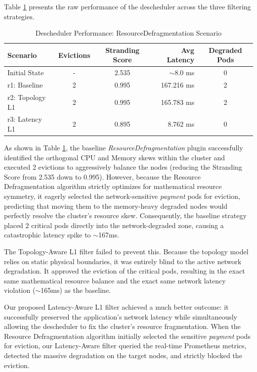 Table \ref{tab:resourcedefrag_results} presents the raw performance of the descheduler across the three filtering strategies.
\begin{table}[tbp]
    \centering
    \begin{tabular}{@{}l c c r c@{}}
        \toprule
        \textbf{Scenario} & \textbf{Evictions} & \textbf{Stranding Score} & \textbf{Avg Latency} & \textbf{Degraded Pods} \\
        \midrule
        Initial State & - & 2.535 & $\sim$8.0 ms & 0 \\
        \midrule
        r1: Baseline & 2 & 0.995 & 167.216 ms & 2 \\
        r2: Topology L1 & 2 & 0.995 & 165.783 ms & 2 \\
        r3: Latency L1 & 2 & 0.895 & 8.762 ms & 0 \\
        \bottomrule
    \end{tabular}
    \caption{Descheduler Performance: ResourceDefragmentation Scenario}
    \label{tab:resourcedefrag_results}
\end{table}

As shown in Table \ref{tab:resourcedefrag_results}, the baseline \textit{ResourceDefragmentation} plugin successfully identified the orthogonal CPU and Memory skews within the cluster and executed 2 evictions to aggressively balance the nodes (reducing the Stranding Score from 2.535 down to 0.995). However, because the Resource Defragmentation algorithm strictly optimizes for mathematical resource symmetry, it eagerly selected the network-sensitive \textit{payment} pods for eviction, predicting that moving them to the memory-heavy degraded nodes would perfectly resolve the cluster's resource skew. Consequently, the baseline strategy placed 2 critical pods directly into the network-degraded zone, causing a catastrophic latency spike to $\sim$167ms.

The Topology-Aware L1 filter failed to prevent this. Because the topology model relies on static physical boundaries, it was entirely blind to the active network degradation. It approved the eviction of the critical pods, resulting in the exact same mathematical resource balance and the exact same network latency violation ($\sim$165ms) as the baseline.

Our proposed Latency-Aware L1 filter achieved a much better outcome: it successfully preserved the application's network latency while simultaneously allowing the descheduler to fix the cluster's resource fragmentation. When the Resource Defragmentation algorithm initially selected the sensitive \textit{payment} pods for eviction, our Latency-Aware filter queried the real-time Prometheus metrics, detected the massive degradation on the target nodes, and strictly blocked the eviction.

